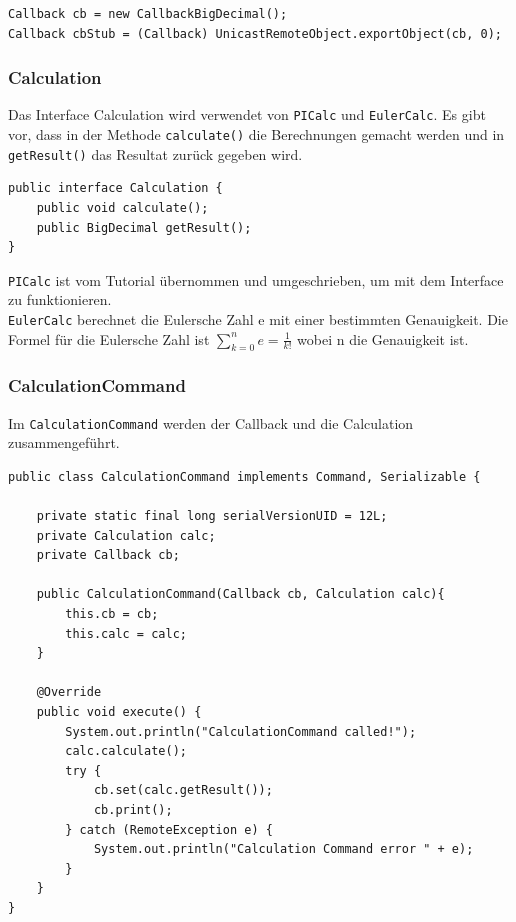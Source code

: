 \begin{lstlisting}[style=Java, caption=Callback]
Callback cb = new CallbackBigDecimal();
Callback cbStub = (Callback) UnicastRemoteObject.exportObject(cb, 0);
\end{lstlisting}

\clearpage

\subsubsection{Calculation}

Das Interface Calculation wird verwendet von \texttt{PICalc} und \texttt{EulerCalc}.
Es gibt vor, dass in der Methode \texttt{calculate()} die Berechnungen gemacht werden und
in \texttt{getResult()} das Resultat zur\"uck gegeben wird.

\begin{lstlisting}[style=Java, caption=Callback Interface]
public interface Calculation {
	public void calculate();
	public BigDecimal getResult();
}
\end{lstlisting}

\texttt{PICalc} ist vom Tutorial \"ubernommen und umgeschrieben, um mit dem Interface zu funktionieren.\\
\texttt{EulerCalc} berechnet die Eulersche Zahl e mit einer bestimmten Genauigkeit.
Die Formel f\"ur die Eulersche Zahl ist \(\sum \limits_{k=0}^n e = \frac{1}{k!}\) wobei n die Genauigkeit ist.

\subsubsection{CalculationCommand}

Im \texttt{CalculationCommand} werden der Callback und die Calculation zusammengef\"uhrt.

\begin{lstlisting}[style=Java, caption=CalculationCommand Klasse]
public class CalculationCommand implements Command, Serializable {

    private static final long serialVersionUID = 12L;
    private Calculation calc;
    private Callback cb;

    public CalculationCommand(Callback cb, Calculation calc){
        this.cb = cb;
        this.calc = calc;
    }

    @Override
    public void execute() {
        System.out.println("CalculationCommand called!");
        calc.calculate();
        try {
            cb.set(calc.getResult());
            cb.print();
        } catch (RemoteException e) {
            System.out.println("Calculation Command error " + e);
        }
    }
}
\end{lstlisting}

